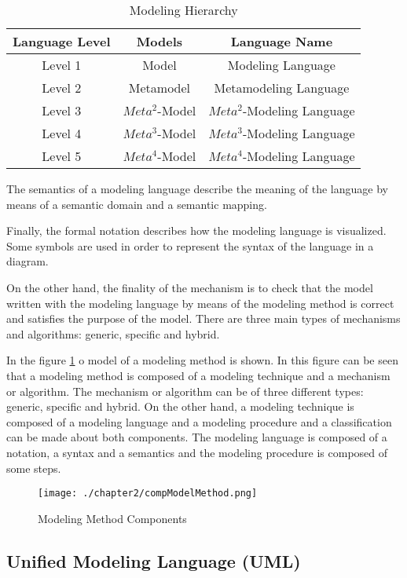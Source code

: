 \begin{table}[h!]
\centering
	\begin{tabular}{||c|c|c||} 
	\hline\hline
	Language Level & Models & Language Name \\ [1ex] 
	\hline\hline
	Level 1 & Model & Modeling Language  \\
	\hline
	Level 2 & Metamodel & Metamodeling Language  \\
	\hline
	Level 3 & $Meta^2$-Model & $Meta^2$-Modeling Language  \\
	\hline
	Level 4 & $Meta^3$-Model & $Meta^3$-Modeling Language  \\
	\hline
	Level 5 & $Meta^4$-Model & $Meta^4$-Modeling Language  \\
	\hline\hline
	\end{tabular}
\caption{Modeling Hierarchy}
\label{Modeling Hierarchy}
\end{table}

The semantics of a modeling language describe the meaning of the language by means of a semantic domain and a semantic mapping.

Finally, the formal notation describes how the modeling language is visualized. Some symbols are used in order to represent the syntax of the language in a diagram.

On the other hand, the finality of the mechanism is to check that the model written with the modeling language by means of the modeling method is correct and satisfies the purpose of the model. There are three main types of mechanisms and algorithms: generic, specific and hybrid.

In the figure \ref{fig:Modeling Method Components} o model of a modeling method is shown. In this figure can be seen that a modeling method is composed of a modeling technique and a mechanism or algorithm. The mechanism or algorithm can be of three different types: generic, specific and hybrid. On the other hand, a modeling technique is composed of a modeling language and a modeling procedure and a classification can be made about both components. The modeling language is composed of a notation, a syntax and a semantics and the modeling procedure is composed of some steps.

\begin{figure}
\centering
{\texttt{[image: ./chapter2/compModelMethod.png]}}
\caption{Modeling Method Components}
\label{fig:Modeling Method Components}
\end{figure}

\subsection{Unified Modeling Language (UML)}

